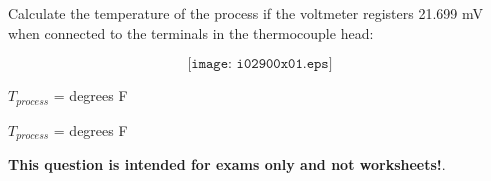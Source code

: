 

Calculate the temperature of the process if the voltmeter registers 21.699 mV when connected to the terminals in the thermocouple head:

$$\texttt{[image: i02900x01.eps]}$$

$T_{process}$ = \underbar{\hskip 50pt} degrees F







$T_{process}$ =  degrees F
 






{\bf This question is intended for exams only and not worksheets!}.




